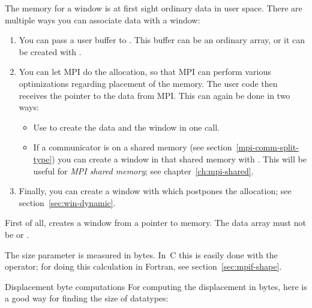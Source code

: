 The memory for a window is at first sight ordinary data in user space. There are multiple
ways you can associate data with a window:
\begin{enumerate}
\item You can pass a user buffer to
  . This buffer can be an ordinary array,
  or it can be created with .
\item You can let MPI do the allocation, so that MPI can perform various
  optimizations regarding placement of the memory. The user code then
  receives the pointer to the data from MPI. This can again be done in two ways:
  \begin{itemize}
  \item Use  to create the data and the
    window in one call.
  \item If a communicator is on a shared memory (see
    section~\ref{mpi-comm-split-type}) you can create a window in that
    shared memory with .
    This will be useful for
    \emph{MPI shared memory};
    see chapter~\ref{ch:mpi-shared}.
  \end{itemize}
\item Finally, you can create a window with
   which postpones the allocation;
  see section~\ref{sec:win-dynamic}.
\end{enumerate}

First of all, 
creates a window from a pointer to memory.
The data array must not be  or .

The size parameter is measured in bytes. In~C this is easily done
with the  operator;
%
%
for doing this calculation in Fortran, see section~\ref{sec:mpif-shape}.

\begin{pythonnote}{Displacement byte computations}
  For computing the displacement in bytes,
  here is a good way for finding the size of  datatypes:
\end{pythonnote}

